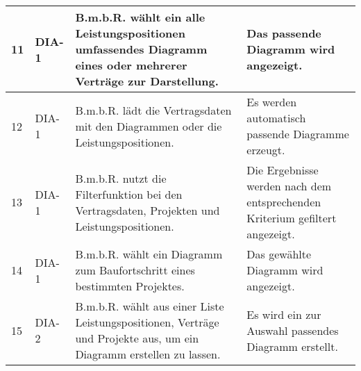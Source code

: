 \begin{longtable}[c]{|p{1cm}|p{3cm}|p{4cm}|p{6cm}|}
    11           & DIA-1                      & B.m.b.R. wählt ein alle Leistungspositionen umfassendes Diagramm eines oder mehrerer Verträge zur Darstellung.     & Das passende Diagramm wird angezeigt.                                                                                                                                      \\ \hline
    12           & DIA-1                      & B.m.b.R. lädt die Vertragsdaten mit den Diagrammen oder die Leistungspositionen.                                   & Es werden automatisch passende Diagramme erzeugt.                                                                                                                          \\ \hline
    13           & DIA-1                      & B.m.b.R. nutzt die Filterfunktion bei den Vertragsdaten, Projekten und Leistungspositionen.                        & Die Ergebnisse werden nach dem entsprechenden Kriterium gefiltert angezeigt.                                                                                               \\ \hline
    14           & DIA-1                      & B.m.b.R. wählt ein Diagramm zum Baufortschritt eines bestimmten Projektes.                                         & Das gewählte Diagramm wird angezeigt.                                                                                                                                      \\ \hline
    15           & DIA-2                      & B.m.b.R. wählt aus einer Liste Leistungspositionen, Verträge und Projekte aus, um ein Diagramm erstellen zu lassen. & Es wird ein zur Auswahl passendes Diagramm erstellt.                                                                                                                      \\ \hline
\end{longtable}